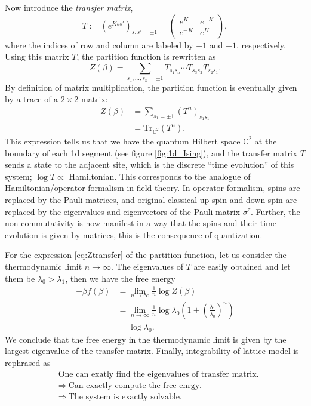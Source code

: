 Now introduce the \emph{transfer matrix},
\begin{equation}
  T  :=  \left(e^{Kss'}\right)_{s,s'=\pm1}
    =
    \left(\begin{array}{ll}
  e^{K}  &  e^{-K}  \\
  e^{-K}  &  e^{K}
\end{array}\right),
\end{equation}
where the indices of row and column are labeled by $+1$ and $-1$,
respectively. Using this matrix $T$, the partition function is rewritten
as
\begin{equation}
  Z\left(\beta\right)
    =\sum_{s_{1},\ldots,s_{n}=\pm1}  T_{s_{1}s_{n}}  \cdots  T_{s_{3}s_{2}}T_{s_{2}s_{1}}.
\end{equation}
By definition of matrix multiplication, the partition function is
eventually given by a trace of a $2\times 2$ matrix:
\begin{align}
  Z(\beta)
  & =  \sum_{s_{1}=\pm1}\left(T^{n}\right)_{s_{1}s_{1}}  \nonumber \\
  & =  \mathrm{Tr}_{\mathbb{C}^{2}}\left(T^{n}\right).
\label{eq:Ztransfer}
\end{align}
This expression tells us that we have the quantum Hilbert space $\mathbb{C}^{2}$
at the boundary of each 1d segment (see figure \ref{fig:1d_Ising}), and the transfer matrix $T$ sends
a state to the adjacent site, which is the discrete ``time evolution''
of this system; $\log T\propto$ Hamiltonian.
This corresponds to the analogue of Hamiltonian/operator
formalism in field theory. In operator formalism, spins
are replaced by the Pauli matrices, and original classical up spin
and down spin are replaced by the eigenvalues and eigenvectors of
the Pauli matrix $\sigma^{z}$. Further, the non-commutativity is
now manifest in a way that the spins and their time evolution is given
by matrices, this is the consequence of quantization.

For the expression \eqref{eq:Ztransfer} of the partition function, let us consider
the thermodynamic limit $n\to\infty$. The eigenvalues of
$T$ are easily obtained and let them be $\lambda_{0}>\lambda_{1}$,
then we have the free energy
\begin{align}
-\beta f(\beta)
  & =  \lim_{n\to\infty}\frac{1}{n}\log Z(\beta)\nonumber \\
  & =  \lim_{n\to\infty}\frac{1}{n}\log\lambda_{0}\left(1+\left(\frac{\lambda_{1}}{\lambda_{0}}\right)^{n}\right)\nonumber \\
  & =  \log\lambda_{0}.
\end{align}
We conclude that the free energy in the thermodynamic limit is
given by the largest eigenvalue of the transfer matrix. Finally, integrability
of lattice model is rephrased as
\begin{align*}
  &  \textrm{One can exatly find the eigenvalues of transfer matrix.} \\
  &  \Rightarrow  ~  \textrm{Can exactly compute the free enrgy.} \\
  &  \Rightarrow  ~  \textrm{The system is exactly solvable.}
\end{align*}

